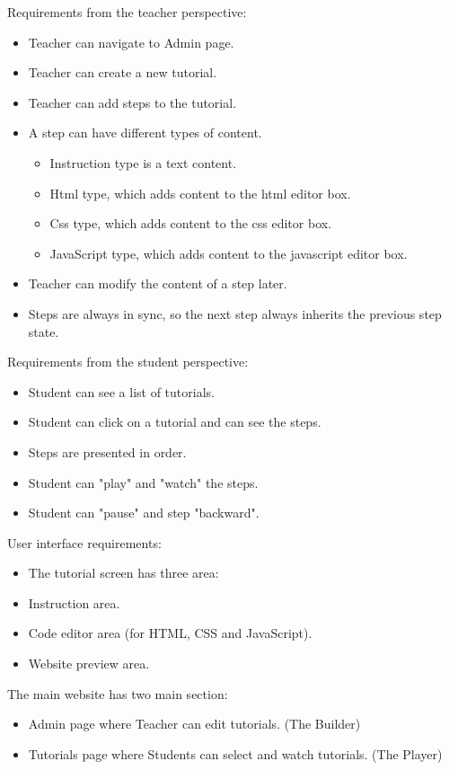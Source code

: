 \documentclass[11pt, a4paper, oneside, openright, medskipamount]{report}
\begin{document}
\noindent Requirements from the teacher perspective:
\begin{itemize}[noitemsep]
\item Teacher can navigate to Admin page.
\item Teacher can create a new tutorial.
\item Teacher can add steps to the tutorial.
\item A step can have different types of content.
\begin{itemize}[noitemsep]
\item Instruction type is a text content.
\item Html type, which adds content to the html editor box.
\item Css type, which adds content to the css editor box.
\item JavaScript type, which adds content to the javascript editor box.
\end{itemize}
\item Teacher can modify the content of a step later.
\item Steps are always in sync, so the next step always inherits the previous step state.
\end{itemize}

\noindent Requirements from the student perspective:
\begin{itemize}[noitemsep]
\item Student can see a list of tutorials.
\item Student can click on a tutorial and can see the steps.
\item Steps are presented in order.
\item Student can "play" and "watch" the steps.
\item Student can "pause" and step "backward".
\end{itemize}

\noindent User interface requirements:
\begin{itemize}[noitemsep]
\item The tutorial screen has three area:
\item Instruction area.
\item Code editor area (for HTML, CSS and JavaScript).
\item Website preview area.
\end{itemize}

\noindent The main website has two main section:
\begin{itemize}[noitemsep]
\item Admin page where Teacher can edit tutorials. (The Builder)
\item Tutorials page where Students can select and watch tutorials. (The Player)
\end{itemize}
\end{document}
